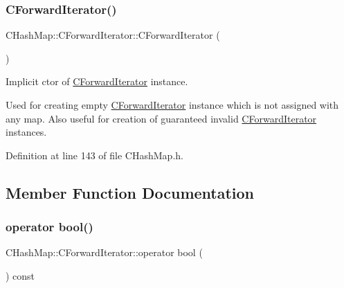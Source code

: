 \mbox{\label{class_c_hash_map_1_1_c_forward_iterator_a2099500f60cfbe8c8c4d801d90010085}} 
\subsubsection{\texorpdfstring{C\+Forward\+Iterator()}{CForwardIterator()}\hspace{0.1cm}{\footnotesize\ttfamily [2/2]}}
{\footnotesize\ttfamily C\+Hash\+Map\+::\+C\+Forward\+Iterator\+::\+C\+Forward\+Iterator (\begin{DoxyParamCaption}{ }\end{DoxyParamCaption})\hspace{0.3cm}{\ttfamily [inline]}}



Implicit c\textquotesingle{}tor of \hyperlink{class_c_hash_map_1_1_c_forward_iterator}{C\+Forward\+Iterator} instance. 

Used for creating empty \hyperlink{class_c_hash_map_1_1_c_forward_iterator}{C\+Forward\+Iterator} instance which is not assigned with any map. Also useful for creation of guaranteed invalid \hyperlink{class_c_hash_map_1_1_c_forward_iterator}{C\+Forward\+Iterator} instances. 

Definition at line 143 of file C\+Hash\+Map.\+h.



\subsection{Member Function Documentation}
\mbox{\label{class_c_hash_map_1_1_c_forward_iterator_a0afdbdba3d254474cd8c40a96f0469b8}} 
\subsubsection{\texorpdfstring{operator bool()}{operator bool()}}
{\footnotesize\ttfamily C\+Hash\+Map\+::\+C\+Forward\+Iterator\+::operator bool (\begin{DoxyParamCaption}{ }\end{DoxyParamCaption}) const\hspace{0.3cm}{\ttfamily [inline]}}



